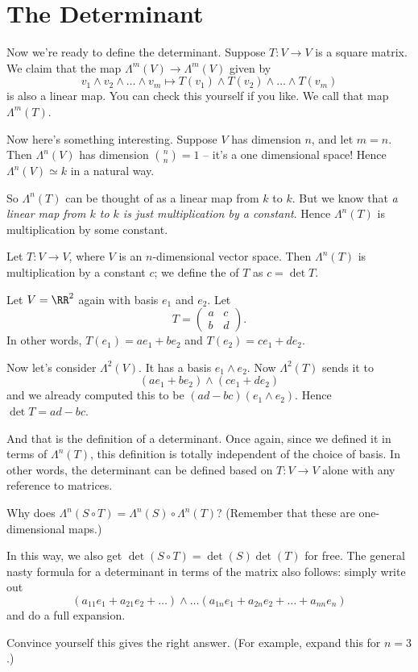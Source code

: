 \section{The Determinant}
Now we're ready to define the determinant.
Suppose $T : V \to V$ is a square matrix.
We claim that the map $\Lambda^m(V) \to \Lambda^m(V)$ given by
\[ v_1 \wedge v_2 \wedge \dots \wedge v_m
	\mapsto T(v_1) \wedge T(v_2) \wedge \dots \wedge T(v_m) \]
is also a linear map.
You can check this yourself if you like.
We call that map $\Lambda^m(T)$.

Now here's something interesting.
Suppose $V$ has dimension $n$, and let $m=n$.
Then $\Lambda^n(V)$ has dimension $\binom nn = 1$ -- it's a one dimensional space!
Hence $\Lambda^n(V) \simeq k$ in a natural way.

So $\Lambda^n(T)$ can be thought of as a linear map from $k$ to $k$.
But we know that \emph{a linear map from $k$ to $k$ is just multiplication by a constant}.
Hence $\Lambda^n(T)$ is multiplication by some constant.
\begin{definition}
	Let $T : V \to V$, where $V$ is an $n$-dimensional vector space.
	Then $\Lambda^n(T)$ is multiplication by a constant $c$;
	we define the  of $T$ as $c = \det T$.
\end{definition}

\begin{example}
	Let $V = \RR^2$ again with basis $e_1$ and $e_2$.
	Let
	\[ T = \left(
		\begin{array}{cc}
			a & c \\ b & d
		\end{array}
		\right).
	\]
	In other words, $T(e_1) = ae_1 + be_2$ and $T(e_2) = ce_1 + de_2$.

	Now let's consider $\Lambda^2(V)$.
	It has a basis $e_1 \wedge e_2$.
	Now $\Lambda^2(T)$ sends it to
	\[ (ae_1 + be_2) \wedge (ce_1 + de_2) \]
	and we already computed this to be $(ad-bc)(e_1 \wedge e_2)$.
	Hence $\det T = ad-bc$.
\end{example}
And that is the definition of a determinant.
Once again, since we defined it in terms of $\Lambda^n(T)$,
this definition is totally independent of the choice of basis.
In other words, the determinant can be defined based on $T : V \to V$ alone
with any reference to matrices.

\begin{ques}
	Why does $\Lambda^n(S \circ T) = \Lambda^n(S) \circ \Lambda^n(T)$?
	(Remember that these are one-dimensional maps.)
\end{ques}
In this way, we also get $\det(S \circ T) = \det(S) \det(T)$ for free.
The general nasty formula for a determinant in terms of the matrix also follows:
simply write out
\[ \left( a_{11}e_1 + a_{21}e_2 + \dots \right) \wedge \dots
	\left( a_{1n}e_1 + a_{2n}e_2 + \dots + a_{nn} e_n \right)
\]
and do a full expansion.
\begin{exercise}
	Convince yourself this gives the right answer.
	(For example, expand this for $n=3$.)
\end{exercise}

